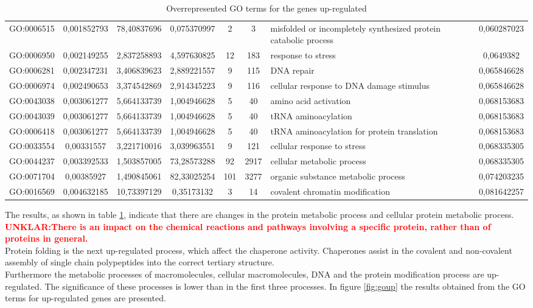 \documentclass[12pt, a4paper]{report}
\newcommand{\HT}[1]{\textcolor{red}\textbf{#1}}
\begin{document}
\begin{table}[H]
\begin{tabular}{c|c|c|c|c|c|p{}|c}
GO:0006515&	0,001852793&	78,40837696&	0,075370997&	2&	3&	misfolded or incompletely synthesized protein catabolic process&	0,060287023\\
GO:0006950&	0,002149255&	2,837258893&	4,597630825&	12&	183&	response to stress&	0,0649382\\
GO:0006281&	0,002347231&	3,406839623&	2,889221557&	9&	115&	DNA repair&	0,065846628\\
GO:0006974&	0,002490653&	3,374542869&	2,914345223&	9&	116&	cellular response to DNA damage stimulus&	0,065846628\\
GO:0043038&	0,003061277&	5,664133739&	1,004946628&	5&	40&	amino acid activation&	0,068153683\\
GO:0043039&	0,003061277&	5,664133739&	1,004946628&	5&	40&	tRNA aminoacylation&	0,068153683\\
GO:0006418&	0,003061277&	5,664133739&	1,004946628&	5&	40&	tRNA aminoacylation for protein translation&	0,068153683\\
GO:0033554&	0,00331557&	3,221710016&	3,039963551&	9&	121&	cellular response to stress&	0,068335305\\
GO:0044237&	0,003392533&	1,503857005&	73,28573288&	92&	2917&	cellular metabolic process&	0,068335305\\
GO:0071704&	0,00385927&	1,490845061&	82,33025254&	101&	3277&	organic substance metabolic process&	0,074203235\\
GO:0016569&	0,004632185&	10,73397129&	0,35173132&	3&	14&	covalent chromatin modification&	0,081642257\\
\hline
\end{tabular}
\caption{Overrepresented GO terms for the genes up-regulated}
\label{tab:GOup}
\end{table}

The results, as shown in table \ref{tab:GOup}, indicate that there are changes in the protein metabolic process and cellular protein metabolic process. \HT{UNKLAR:There is an impact on the chemical reactions and pathways involving a specific protein, rather than of proteins in general.} \\
Protein folding is the next up-regulated process, which affect the chaperone activity. Chaperones assist in the covalent and non-covalent assembly of single chain polypeptides into the correct tertiary structure. \\
Furthermore the metabolic processes of macromolecules, cellular macromolecules, DNA and the protein modification process are up-regulated. The significance of these processes is lower than in the first three processes. In figure \ref{fig:goup} the results obtained from the GO terms for up-regulated genes are presented. 
\end{document}
